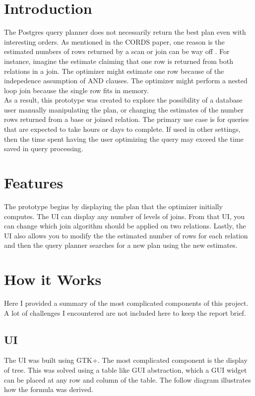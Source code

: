 \documentclass[letterpaper,10pt]{article}
\begin{document}
\raggedright

\setlength{\columnseprule}{0.5pt}


\section{Introduction}
The Postgres query planner does not necessarily return the best plan even with
interesting orders. As mentioned in the CORDS paper, one reason is the estimated
numbers of rows returned by a scan or join can be way off \cite{Ilyas04}. For
instance, imagine the estimate claiming that one row is returned from both
relations in a join. The optimizer might estimate one row because of the
indepedence assumption of AND clauses. The optimizer might perform a nested loop
join because the single row fits in memory. \\[0.5cm]

As a result, this prototype was created to explore the possibility of a
database user manually manipulating the plan, or changing the estimates of
the number rows returned from a base or joined relation. The primary use case is
for queries that are expected to take hours or days to complete. If used in
other settings, then the time spent having the user optimizing the query may
exceed the time saved in query processing.

\section{Features}
The prototype begins by displaying the plan that the optimizer initially
computes. The UI can display any number of levels of joins. From that UI, you
can change which join algorithm should be applied on two relations. Lastly, the
UI also allows you to modify the the estimated number of rows for each relation
and then the query planner searches for a new plan using the new estimates.

\section{How it Works}
Here I provided a summary of the most complicated components of this project. A
lot of challenges I encountered are not included here to keep the report brief.

\subsection{UI}
The UI was built using GTK+. The most complicated component is the display of
tree. This was solved using a table like GUI abstraction, which a GUI widget can
be placed at any row and column of the table. The follow diagram illustrates how
the formula was derived.
\end{document}
